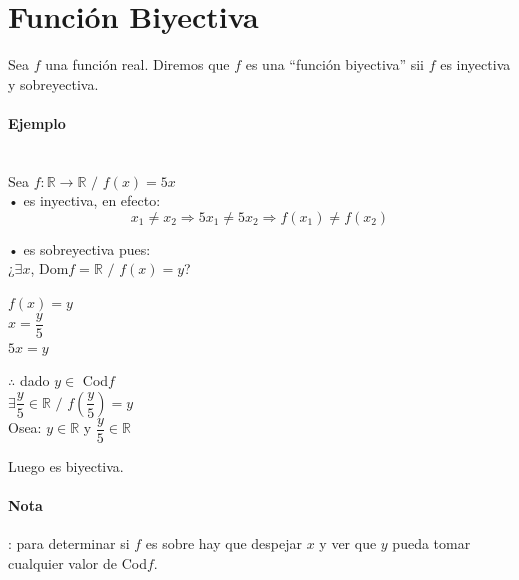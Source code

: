 \section{Función Biyectiva}

Sea $f$ una función real. Diremos que $f$ es una ``función biyectiva'' sii $f$ es inyectiva y sobreyectiva.\\

\paragraph{Ejemplo}
\qquad\\

\qquad Sea $f: \mathbb{R} \longrightarrow \mathbb{R}$ $/$ $f(x)=5x$\\

\qquad • es inyectiva, en efecto:
$$x_1 \neq x_2 \Rightarrow 5x_1 \neq 5x_2 \Rightarrow f(x_1) \neq f(x_2)$$

\qquad • es sobreyectiva pues:\\

\qquad \qquad ¿$\exists x$, Dom$f= \mathbb{R}$ $/$ $f(x)=y$?\\

\hfill
\begin{minipage}{.45\textwidth}
\begin{center}
$f(x)=y$\\$x=\dfrac{y}{5}$\\
$5x=y$
\end{center}
\end{minipage}
\hfill
\begin{minipage}{.45\textwidth}
$\therefore$ dado $y \in $ Cod$f$\\

\qquad \qquad $ \exists \dfrac{y}{5} \in \mathbb{R}$ $/$ $f\left(\dfrac{y}{5}\right)=y$\\

\qquad \qquad \qquad Osea: $y \in \mathbb{R}$ y $\dfrac{y}{5} \in \mathbb{R}$ 
\end{minipage}
\hfill
\begin{center}
Luego es biyectiva.
\end{center}

\paragraph{Nota}
: para determinar si $f$ es sobre hay que despejar $x$ y ver que $y$ pueda tomar cualquier valor de Cod$f$.

